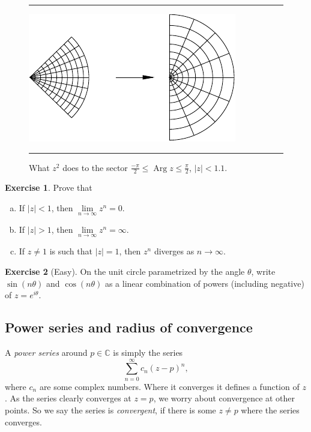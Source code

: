 \documentclass[12pt,openany]{book}
\newcommand{\sabs}[1]{\lvert {#1} \rvert}
\newcommand{\C}{{\mathbb{C}}}
\newcommand{\myindex}[1]{#1\index{#1}}
\theoremstyle{plain}
\theoremstyle{remark}
\theoremstyle{definition}
\newenvironment{exbox}{%
    \def\FrameCommand{\vrule width 1pt \relax\hspace {10pt}}%
    \MakeFramed {\advance \hsize -\width \FrameRestore }%
}{%
    \endMakeFramed
}
\newenvironment{exparts}{%
    \leavevmode\begin{enumerate}[a),noitemsep,topsep=0pt,parsep=0pt,partopsep=0pt]
}{%
    \end{enumerate}
}
\newenvironment{myfig}{%
\begin{figure}[h!t]
\noindent\rule{\textwidth}{0.4pt}\vspace{12pt}\par\centering}%
{\par\noindent\rule{\textwidth}{0.4pt}
\end{figure}}
\theoremstyle{exercise}
\newtheorem{exercise}{Exercise}[section]
\theoremstyle{example}
\begin{document}
\begin{myfig}
\includegraphics{figures/zsqplot}
\caption{What $z^2$ does to the sector
$\frac{-\pi}{2} \leq \operatorname{Arg} z \leq \frac{\pi}{2}$, $\sabs{z} <
1.1$.\label{fig:zsqplot}}
\end{myfig}

\begin{exbox}
\begin{exercise}
Prove that
\begin{exparts}
\item
If $\sabs{z}<1$, then $\lim\limits_{n\to \infty} z^n = 0$.
\item
If $\sabs{z}>1$, then $\lim\limits_{n\to \infty} z^n = \infty$.
\item
If $z \not= 1$ is such that $\sabs{z}=1$, then $z^n$ diverges as $n \to
\infty$.
\end{exparts}
\end{exercise}

\begin{exercise}[Easy]
On the unit circle parametrized by the angle $\theta$,
write $\sin(n\theta)$ and $\cos(n\theta)$ as a linear combination
of powers (including negative) of $z = e^{i\theta}$.
\end{exercise}
\end{exbox}

\subsection{Power series and radius of convergence}

A \emph{\myindex{power series}} around $p \in \C$ is simply the series
\begin{equation*}
\sum_{n=0}^\infty c_n {(z-p)}^n ,
\end{equation*}
where $c_n$ are some complex numbers.  Where it converges it defines a
function of $z$.  As the series clearly converges at $z=p$, we worry about
convergence at other points.  So we say the series is
\emph{convergent}, if there is
some $z \not= p$ where the series converges.
\end{document}
